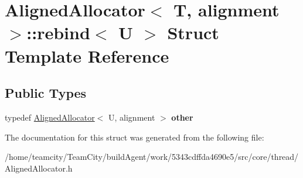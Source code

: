 \hypertarget{structAlignedAllocator_1_1rebind}{}\section{Aligned\+Allocator$<$ T, alignment $>$\+:\+:rebind$<$ U $>$ Struct Template Reference}
\label{structAlignedAllocator_1_1rebind}
\subsection*{Public Types}
\begin{DoxyCompactItemize}
\item 
typedef \hyperlink{classAlignedAllocator}{Aligned\+Allocator}$<$ U, alignment $>$ {\bfseries other}\hypertarget{structAlignedAllocator_1_1rebind_aa31aaef3aaf01c130f069a84ed2689e3}{}\label{structAlignedAllocator_1_1rebind_aa31aaef3aaf01c130f069a84ed2689e3}

\end{DoxyCompactItemize}


The documentation for this struct was generated from the following file\+:\begin{DoxyCompactItemize}
\item 
/home/teamcity/\+Team\+City/build\+Agent/work/5343cdffda4690e5/src/core/thread/Aligned\+Allocator.\+h\end{DoxyCompactItemize}
